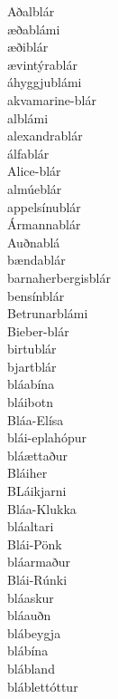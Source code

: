 \documentclass[../samsetningasafn.tex]{subfiles}
\begin{document}
\begin{bigwordlist}
\begin{footnotesize}
\begin{multicols}{4}
	\begin{description}
		\item [Aðalblár]
		\item [æðablámi]
		\item [æðiblár]
		\item [ævintýrablár]
		\item [áhyggjublámi]
		\item [akvamarine-blár]
		\item [alblámi]
		\item [alexandrablár]
		\item [álfablár]
		\item [Alice-blár]
		\item [almúeblár]
		\item [appelsínublár]
		\item [Ármannablár]
		\item [Auðnablá]
		\item [bændablár]
		\item [barnaherbergisblár]
		\item [bensínblár]
		\item [Betrunarblámi]
		\item [Bieber-blár]
		\item [birtublár]
		\item [bjartblár]
		\item [bláabína]
		\item [bláibotn]
		\item [Bláa-Elísa]
		\item [blái-eplahópur]
		\item [bláættaður]
		\item [Bláiher]
		\item [BLáikjarni]
		\item [Bláa-Klukka]
		\item [bláaltari]
		\item [Blái-Pönk]
		\item [bláarmaður]
		\item [Blái-Rúnki]
		\item [bláaskur]
		\item [bláauðn]
		\item [blábeygja]
		\item [blábína]
		\item [blábland]
		\item [bláblettóttur]

\end{description}
\end{multicols}
\end{footnotesize}
\end{bigwordlist}
\end{document}
